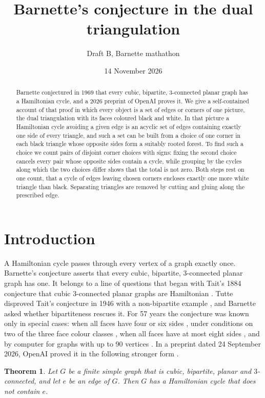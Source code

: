 \documentclass[10pt]{amsart}
\title{Barnette's conjecture in the dual triangulation}
\author{Draft B, Barnette mathathon}
\date{14 November 2026}
\numberwithin{equation}{section}
\newtheorem{theorem}[equation]{Theorem}
\theoremstyle{definition}
\theoremstyle{remark}
\begin{document}
\begin{abstract}
Barnette conjectured in 1969 that every cubic, bipartite, 3-connected planar graph has a Hamiltonian cycle, and a 2026 preprint of OpenAI proves it.
We give a self-contained account of that proof in which every object is a set of edges or corners of one picture, the dual triangulation with its faces coloured black and white.
In that picture a Hamiltonian cycle avoiding a given edge is an acyclic set of edges containing exactly one side of every triangle, and such a set can be built from a choice of one corner in each black triangle whose opposite sides form a suitably rooted forest.
To find such a choice we count pairs of disjoint corner choices with signs: fixing the second choice cancels every pair whose opposite sides contain a cycle, while grouping by the cycles along which the two choices differ shows that the total is not zero.
Both steps rest on one count, that a cycle of edges leaving chosen corners encloses exactly one more white triangle than black.
Separating triangles are removed by cutting and gluing along the prescribed edge.
\end{abstract}
\maketitle

\section{Introduction}

A Hamiltonian cycle passes through every vertex of a graph exactly once.
Barnette's conjecture \cite{barnette1969} asserts that every cubic, bipartite, 3-connected planar graph has one.
It belongs to a line of questions that began with Tait's 1884 conjecture that cubic 3-connected planar graphs are Hamiltonian \cite{tait1884}.
Tutte disproved Tait's conjecture in 1946 with a non-bipartite example \cite{tutte1946}, and Barnette asked whether bipartiteness rescues it.
For 57 years the conjecture was known only in special cases: when all faces have four or six sides \cite{goodey1975}, under conditions on two of the three face colour classes \cite{feder-subi2006}, when all faces have at most eight sides \cite{schnieders2025}, and by computer for graphs with up to 90 vertices \cite{hmm1985,bgm2021}.
In a preprint dated 24 September 2026, OpenAI proved it in the following stronger form \cite{openai2026}.

\begin{theorem}\label{thm:main}
Let $G$ be a finite simple graph that is cubic, bipartite, planar and $3$-connected, and let $e$ be an edge of $G$.
Then $G$ has a Hamiltonian cycle that does not contain $e$.
\end{theorem}
\end{document}
